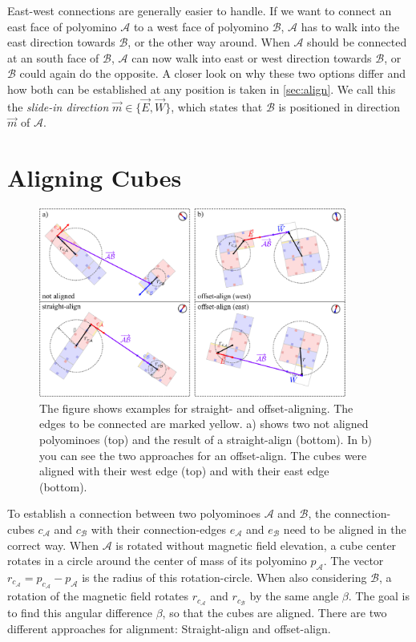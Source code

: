 East-west connections are generally easier to handle.
If we want to connect an east face of polyomino $\mathcal{A}$ to a west face of polyomino $\mathcal{B}$, $\mathcal{A}$ has to walk into the east direction towards $\mathcal{B}$, or the other way around.
When $\mathcal{A}$ should be connected at an south face of $\mathcal{B}$, $\mathcal{A}$ can now walk into east or west direction towards $\mathcal{B}$, or $\mathcal{B}$ could again do the opposite.
A closer look on why these two options differ and how both can be established at any position is taken in \autoref{sec:align}.
We call this the \textit{slide-in direction} $\vec{m} \in \{\vec{E}, \vec{W}\}$, which states that $\mathcal{B}$ is positioned in direction $\vec{m}$ of $\mathcal{A}$.


\section{Aligning Cubes}
\label{sec:align}

\begin{figure}
	\centering
	\includegraphics[width=0.90\textwidth]{figures/aligning.pdf}
	\caption[Illustration of straight- and offset-aligning]{The figure shows examples for straight- and offset-aligning. The edges to be connected are marked yellow. a) shows two not aligned polyominoes (top) and the result of a straight-align (bottom). In b) you can see the two approaches for an offset-align. The cubes were aligned with their west edge (top) and with their east edge (bottom).}
	\label{fig:aligning}
\end{figure}

To establish a connection between two polyominoes $\mathcal{A}$ and $\mathcal{B}$, the connection-cubes $c_\mathcal{A}$ and $c_\mathcal{B}$ with their connection-edges $e_\mathcal{A}$ and $e_\mathcal{B}$ need to be aligned in the correct way.
When $\mathcal{A}$ is rotated without magnetic field elevation, a cube center rotates in a circle around the center of mass of its polyomino $p_\mathcal{A}$.
The vector $r_{c_\mathcal{A}} = p_{c_\mathcal{A}} - p_\mathcal{A}$ is the radius of this rotation-circle.
When also considering $\mathcal{B}$, a rotation of the magnetic field rotates $r_{c_\mathcal{A}}$ and $r_{c_\mathcal{B}}$ by the same angle $\beta$.
The goal is to find this angular difference $\beta$, so that the cubes are aligned.
There are two different approaches for alignment: Straight-align and offset-align.

